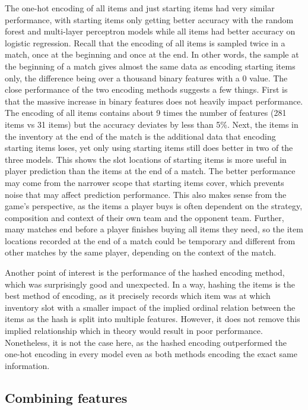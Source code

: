 \documentclass[Report.tex]{subfiles}
\begin{document}
The one-hot encoding of all items and just starting items had very similar performance, with starting items only getting better accuracy with the random forest and multi-layer perceptron models while all items had better accuracy on logistic regression. Recall that the encoding of all items is sampled twice in a match, once at the beginning and once at the end. In other words, the sample at the beginning of a match gives almost the same data as encoding starting items only, the difference being over a thousand binary features with a 0 value. The close performance of the two encoding methods suggests a few things. First is that the massive increase in binary features does not heavily impact performance. The encoding of all items contains about 9 times the number of features (281 items vs 31 items) but the accuracy deviates by less than 5\%. Next, the items in the inventory at the end of the match is the additional data that encoding starting items loses, yet only using starting items still does better in two of the three models. This shows the slot locations of starting items is more useful in player prediction than the items at the end of a match. The better performance may come from the narrower scope that starting items cover, which prevents noise that may affect prediction performance. This also makes sense from the game's perspective, as the items a player buys is often dependent on the strategy, composition and context of their own team and the opponent team. Further, many matches end before a player finishes buying all items they need, so the item locations recorded at the end of a match could be temporary and different from other matches by the same player, depending on the context of the match. 

Another point of interest is the performance of the hashed encoding method, which was surprisingly good and unexpected. In a way, hashing the items is the best method of encoding, as it precisely records which item was at which inventory slot with a smaller impact of the implied ordinal relation between the items as the hash is split into multiple features. However, it does not remove this implied relationship which in theory would result in poor performance. Nonetheless, it is not the case here, as the hashed encoding outperformed the one-hot encoding in every model even as both methods encoding the exact same information. 

\subsection{Combining features}
\end{document}
